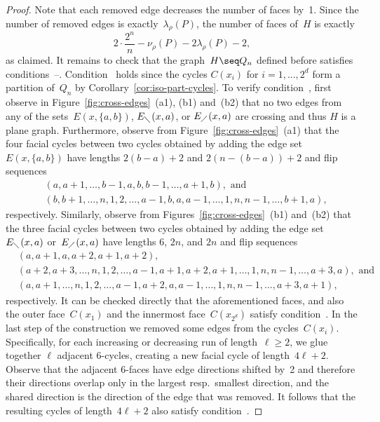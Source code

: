 \begin{proof}
%
Note that each removed edge decreases the number of faces by~1.
Since the number of removed edges is exactly~$\lambda_\rho(P)$, the number of faces of~$H$ is exactly
\[ 2\cdot\frac{2^n}{n}-\nu_\rho(P)-2\lambda_\rho(P)-2, \]
as claimed.
%
It remains to check that the graph~$H\seq Q_n$ defined before satisfies conditions~--.
%
Condition~ holds since the cycles $C(x_i)$ for $i=1,\dots,2^d$ form a partition of~$Q_n$ by Corollary~\ref{cor:iso-part-cycles}.
%
To verify condition~, first observe in Figure~\ref{fig:cross-edges}~(a1), (b1) and~(b2) that no two edges from any of the sets~$E(x,\{a,b\})$, $E_{\diagdown}(x,a)$, or $E_{\diagup}(x,a)$ are crossing and thus $H$ is a plane graph.
Furthermore, observe from Figure~\ref{fig:cross-edges}~(a1) that the four facial cycles between two cycles obtained by adding the edge set~$E(x,\{a,b\})$ have lengths $2(b-a)+2$ and $2(n-(b-a))+2$ and flip sequences
\begin{align*}
   & (a,a+1,\ldots,b-1,a,b,b-1,\dots,a+1,b), \text{ and} \\
   & (b,b+1,\ldots,n,1,2,\dots,a-1,b,a,a-1,\ldots,1,n,n-1,\dots,b+1,a),
\end{align*}
respectively.
Similarly, observe from Figures~\ref{fig:cross-edges}~(b1) and~(b2) that the three facial cycles between two cycles obtained by adding the edge set~$E_{\diagdown}(x,a)$ or~$E_{\diagup}(x,a)$ have lengths 6, $2n$, and $2n$ and flip sequences
\begin{align*}
   & (a,a+1,a,a+2,a+1,a+2), \\
   & (a+2,a+3,\ldots,n,1,2,\ldots,a-1,a+1,a+2,a+1,\dots,1,n,n-1,\ldots,a+3,a), \text{ and} \\
   & (a,a+1,\ldots,n,1,2,\ldots,a-1,a+2,a,a-1,\ldots,1,n,n-1,\dots,a+3,a+1),
\end{align*}
respectively.
It can be checked directly that the aforementioned faces, and also the outer face~$C(x_1)$ and the innermost face~$C(x_{2^d})$ satisfy condition~.
%
In the last step of the construction we removed some edges from the cycles~$C(x_i)$.
Specifically, for each increasing or decreasing run of length~$\ell\geq 2$, we glue together $\ell$ adjacent 6-cycles, creating a new facial cycle of length~$4\ell+2$.
Observe that the adjacent 6-faces have edge directions shifted by~2 and therefore their directions overlap only in the largest resp.\ smallest direction, and the shared direction is the direction of the edge that was removed.
It follows that the resulting cycles of length~$4\ell+2$ also satisfy condition~.

\end{proof}

